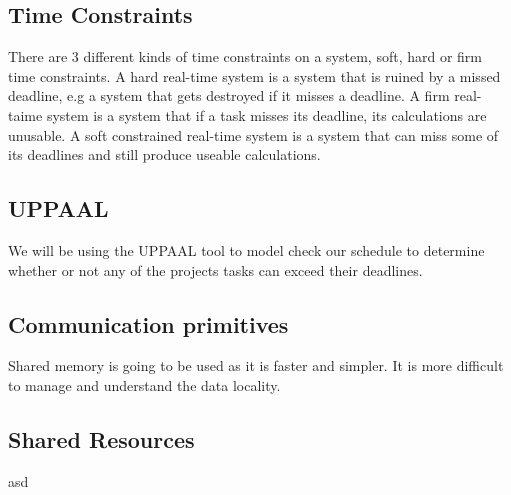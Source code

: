 \subsection{\textbf{Time Constraints}}
There are 3 different kinds of time constraints on a system, soft, hard or firm time constraints. A hard real-time system is a system that is ruined by a missed deadline, e.g a system that gets destroyed if it misses a deadline. A firm real-taime system is a system that if a task misses its deadline, its calculations are unusable. A soft constrained real-time system is a system that can miss some of its deadlines and still produce useable calculations.



\subsection{\textbf{UPPAAL}}
We will be using the UPPAAL tool to model check our schedule to determine whether or not any of the projects tasks can exceed their deadlines.

\subsection{\textbf{Communication primitives}}
Shared memory is going to be used as it is faster and simpler. It is more difficult to manage and understand the data locality. 

\subsection{\textbf{Shared Resources}} 
 asd


